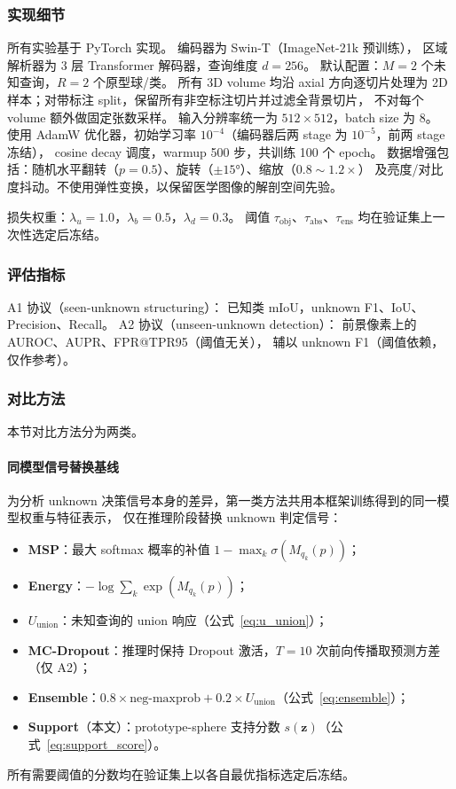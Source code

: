 \documentclass[3p,twocolumn,authoryear]{elsarticle}
\newcommand{\bz}{\mathbf{z}}                              %
\newcommand{\tobj}{\tau_{\text{obj}}}                     %
\newcommand{\tabs}{\tau_{\text{abs}}}                     %
\newcommand{\tens}{\tau_{\text{ens}}}                     %
\begin{document}
\subsubsection{实现细节}\label{sec:exp:setup:impl}

所有实验基于 PyTorch 实现。
编码器为 Swin-T（ImageNet-21k 预训练），
区域解析器为 3 层 Transformer 解码器，查询维度 $d=256$。
默认配置：$M=2$ 个未知查询，$R=2$ 个原型球/类。
所有 3D volume 均沿 axial 方向逐切片处理为 2D 样本；对带标注 split，保留所有非空标注切片并过滤全背景切片，
不对每个 volume 额外做固定张数采样。
输入分辨率统一为 $512 \times 512$，batch size 为 8。
使用 AdamW 优化器，初始学习率 $10^{-4}$（编码器后两 stage 为 $10^{-5}$，前两 stage 冻结），
cosine decay 调度，warmup 500 步，共训练 100 个 epoch。
数据增强包括：随机水平翻转（$p=0.5$）、旋转（$\pm 15°$）、缩放（$0.8 \sim 1.2\times$）
及亮度/对比度抖动。不使用弹性变换，以保留医学图像的解剖空间先验。

损失权重：$\lambda_u = 1.0$，$\lambda_b = 0.5$，$\lambda_d = 0.3$。
阈值 $\tobj$、$\tabs$、$\tens$ 均在验证集上一次性选定后冻结。

\subsubsection{评估指标}\label{sec:exp:setup:metric}

A1 协议（seen-unknown structuring）：
已知类 mIoU，unknown F1、IoU、Precision、Recall。
A2 协议（unseen-unknown detection）：
前景像素上的 AUROC、AUPR、FPR@TPR95（阈值无关），
辅以 unknown F1（阈值依赖，仅作参考）。

\subsubsection{对比方法}\label{sec:exp:setup:baseline}

本节对比方法分为两类。

\paragraph{同模型信号替换基线}
为分析 unknown 决策信号本身的差异，第一类方法共用本框架训练得到的同一模型权重与特征表示，
仅在推理阶段替换 unknown 判定信号：
\begin{itemize}[nosep]
  \item \textbf{MSP}：最大 softmax 概率的补值 $1 - \max_k \sigma(M_{q_k}(p))$；
  \item \textbf{Energy}：$-\log \sum_k \exp(M_{q_k}(p))$；
  \item \textbf{$U_{\text{union}}$}：未知查询的 union 响应（公式~\eqref{eq:u_union}）；
  \item \textbf{MC-Dropout}：推理时保持 Dropout 激活，$T=10$ 次前向传播取预测方差（仅 A2）；
  \item \textbf{Ensemble}：$0.8 \times \text{neg-maxprob} + 0.2 \times U_{\text{union}}$（公式~\eqref{eq:ensemble}）；
  \item \textbf{Support}（本文）：prototype-sphere 支持分数 $s(\bz)$（公式~\eqref{eq:support_score}）。
\end{itemize}
所有需要阈值的分数均在验证集上以各自最优指标选定后冻结。
\end{document}
